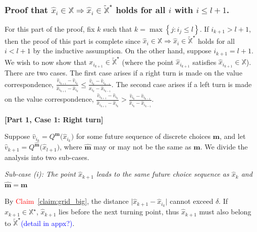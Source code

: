\documentclass[12pt]{article}
\newcommand{\mVecVar}{\mathbf{m}}
\begin{document}
\subsubsection{\textbf{Proof that $\hat{x}_{i} \in \mathbb{X}\Longrightarrow  \hat{x}_{i} \in \widetilde{\mathbb{X}}^{\star} $ holds for all $i$ with $i\leq l+1$.}}

For this part of the proof, fix $k$ such that $k = \max\left\{j:i_{j}\leq l\right\}$. If $i_{k+1}> l+1$, then the proof of this part is complete since $\hat{x}_{i} \in \mathbb{X} \Longrightarrow  \hat{x}_{i} \in \widetilde{\mathbb{X}}^{\star}$ holds for all $i< l+1$ by the inductive assumption. On the other hand, suppose  $i_{k+1}= l+1$. We wish to now show that $x_{i_{k+1}}\in \widetilde{\mathbb{X}}^{\star}$ (where the point $\hat{x}_{i_{k+1}}$ satisfies  $\hat{x}_{i_{k+1}}\in \mathbb{X}$). There are two cases. The first case arises if a right turn is made on the value correspondence, $\frac{\hat{v}_{i_{k+1}} - \hat{v}_{i_k}}{\hat{x}_{i_{k+1}}-\hat{x}_{i_k}} \leq \frac{\hat{v}_{i_{k}} - \hat{v}_{i_{k-1}}}{x_{i_k}-\hat{x}_{i_{k-1}}}$. The second case arises if a left turn is made on the value correspondence, $\frac{\hat{v}_{i_{k+1}} - \hat{v}_{i_k}}{\hat{x}_{i_{k+1}}-\hat{x}_{i_k}} > \frac{\hat{v}_{i_k} - \hat{v}_{i_{k-1}}}{\hat{x}_{i_k}-\hat{x}_{i_{k-1}}}$. 


\textbf{[Part 1, Case 1: Right turn]}

Suppose $\hat{v}_{i_{k}} = Q^{\mVecVar}\bigl(\hat{x}_{i_{k}}\bigr)$ for some future sequence of discrete choices $\mVecVar$, and let $\hat{v}_{k+1} = Q^{\hat{\mVecVar}}\bigl(\hat{x}_{l+1}\bigr)$, where $\hat{\mVecVar}$ may or may not be the same as $\mVecVar$.  
We divide the analysis into two sub-cases.

\textit{Sub-case (i): The point $\hat{x}_{k+1}$ leads to the same future choice sequence as $\hat{x}_{k}$ and $\hat{\mVecVar} = \mVecVar$}


By \textcolor{red}{Claim}~\ref{claim:grid_big}, the distance $\vert \hat{x}_{k+1} - \hat{x}_{i_{k}}\vert$ cannot exceed $\delta$.
If $\hat{x}_{k+1}\in \mathbb{X}^{\star}$, $\hat{x}_{k+1}$ lies before the next turning point, thus $\hat{x}_{k+1}$ must also belong to $\widetilde{\mathbb{X}}^{\star}$\textcolor{blue}{(detail in appx?)}.
\end{document}
